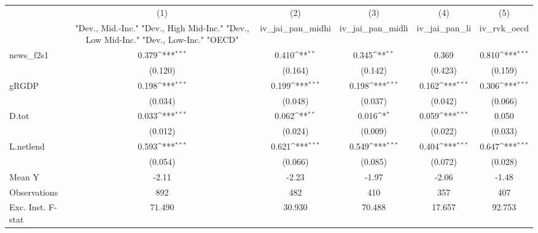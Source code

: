 {
\def\sym#1{\ifmmode^{#1}\else\(^{#1}\)\fi}
\begin{tabular}{l*{5}{c}}
\toprule
            &\multicolumn{1}{c}{(1)}&\multicolumn{1}{c}{(2)}&\multicolumn{1}{c}{(3)}&\multicolumn{1}{c}{(4)}&\multicolumn{1}{c}{(5)}\\
            &\multicolumn{1}{c}{ "Dev., Mid.-Inc." "Dev., High Mid-Inc." "Dev., Low Mid-Inc." "Dev., Low-Inc." "OECD" }&\multicolumn{1}{c}{iv\_jai\_pan\_midhi}&\multicolumn{1}{c}{iv\_jai\_pan\_midli}&\multicolumn{1}{c}{iv\_jai\_pan\_li}&\multicolumn{1}{c}{iv\_rvk\_oecd}\\
\midrule
news\_f2s1   &       0.379\sym{***}&       0.410\sym{**} &       0.345\sym{**} &       0.369         &       0.810\sym{***}\\
            &     (0.120)         &     (0.164)         &     (0.142)         &     (0.423)         &     (0.159)         \\
\addlinespace
gRGDP       &       0.198\sym{***}&       0.199\sym{***}&       0.198\sym{***}&       0.162\sym{***}&       0.306\sym{***}\\
            &     (0.034)         &     (0.048)         &     (0.037)         &     (0.042)         &     (0.066)         \\
\addlinespace
D.tot       &       0.033\sym{***}&       0.062\sym{**} &       0.016\sym{*}  &       0.059\sym{***}&       0.050         \\
            &     (0.012)         &     (0.024)         &     (0.009)         &     (0.022)         &     (0.033)         \\
\addlinespace
L.netlend   &       0.593\sym{***}&       0.621\sym{***}&       0.549\sym{***}&       0.404\sym{***}&       0.647\sym{***}\\
            &     (0.054)         &     (0.066)         &     (0.085)         &     (0.072)         &     (0.028)         \\
\midrule
Mean Y      &       -2.11         &       -2.23         &       -1.97         &       -2.06         &       -1.48         \\
Observations&         892         &         482         &         410         &         357         &         407         \\
Exc. Inst. F-stat&      71.490         &      30.930         &      70.488         &      17.657         &      92.753         \\
\bottomrule
\end{tabular}
}
